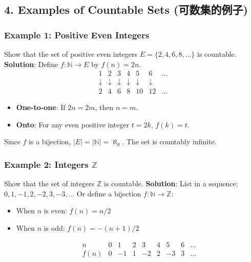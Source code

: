 \documentclass[10pt,a4paper,openany]{ctexbook}
\theoremstyle{definition}
\theoremstyle{remark}
\begin{document}
\subsection{4. Examples of Countable Sets (可数集的例子)}

\subsubsection{Example 1: Positive Even Integers}

Show that the set of positive even integers $E = \{2, 4, 6, 8, \dots\}$ is countable.
\textbf{Solution}: Define $f: \mathbb{N} \to E$ by $f(n) = 2n$.
\[
\begin{array}{ccccccc}
1 & 2 & 3 & 4 & 5 & 6 & \dots \\
\downarrow & \downarrow & \downarrow & \downarrow & \downarrow & \downarrow \\
2 & 4 & 6 & 8 & 10 & 12 & \dots
\end{array}
\]

\begin{itemize}
\item \textbf{One-to-one}: If $2n = 2m$, then $n = m$.
\item \textbf{Onto}: For any even positive integer $t = 2k$, $f(k) = t$.

\end{itemize}

Since $f$ is a bijection, $|E| = |\mathbb{N}| = \aleph_0$. The set is countably infinite.
\subsubsection{Example 2: Integers $\mathbb{Z}$}

Show that the set of integers $\mathbb{Z}$ is countable.
\textbf{Solution}: List in a sequence: $0, 1, -1, 2, -2, 3, -3, \dots$
Or define a bijection $f: \mathbb{N} \to \mathbb{Z}$:
\begin{itemize}
\item When $n$ is even: $f(n) = n/2$
\item When $n$ is odd: $f(n) = -(n+1)/2$

\[
\begin{array}{c|cccccccc}
n & 0 & 1 & 2 & 3 & 4 & 5 & 6 & \dots \\
\hline
f(n) & 0 & -1 & 1 & -2 & 2 & -3 & 3 & \dots
\end{array}
\]


\end{itemize}
\end{document}
